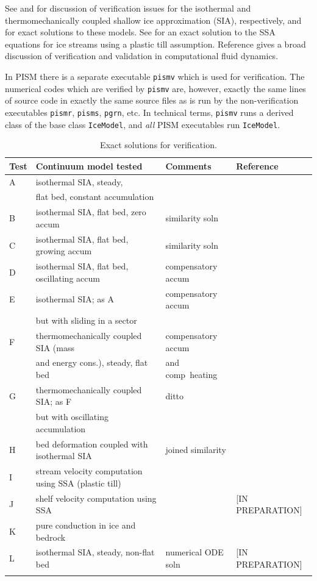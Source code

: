\documentclass[11pt,final]{amsart}
\begin{document}
See \cite{BLKCB} and \cite{BBL} for discussion of verification issues for the isothermal and thermomechanically coupled shallow ice approximation (SIA), respectively, and for exact solutions to these models.  See \cite{SchoofStream} for an exact solution to the SSA equations for ice streams using a plastic till assumption.  Reference \cite{Roache} gives a broad discussion of verification and validation in computational fluid dynamics.

In PISM there is a separate executable \verb|pismv| which is used for verification.  The numerical codes which are verified by \verb|pismv| are, however, exactly the same lines of source code in exactly the same source files as is run by the non-verification executables \verb|pismr|, \verb|pisms|, \verb|pgrn|, etc.  In technical terms, \verb|pismv| runs a derived class of the base class \verb|IceModel|, and \emph{all} PISM executables run \verb|IceModel|.

\begin{table}[ht]
\caption{Exact solutions for verification.}\label{tab:tests}
\small
\begin{tabular}{@{}llll}\hline
\textbf{Test} & \textbf{Continuum model tested} & \textbf{Comments} & \textbf{Reference} \\ \hline
A & isothermal SIA, steady, &  & \cite{BLKCB} \\
 & flat bed, constant accumulation &  &  \\
B & isothermal SIA, flat bed, zero accum & similarity soln & \cite{BLKCB} \\
C & isothermal SIA, flat bed, growing accum & similarity soln & \cite{BLKCB} \\
D & isothermal SIA, flat bed, oscillating accum & compensatory accum & \cite{BLKCB} \\
E & isothermal SIA; as A &  compensatory accum & \cite{BLKCB} \\
 & but with sliding in a sector &  &  \\
F & thermomechanically coupled SIA (mass &  compensatory accum & \cite{BB,BBL} \\
 & and energy cons.), steady, flat bed & and comp~heating &  \\
G & thermomechanically coupled SIA; as F  & ditto & \cite{BB,BBL} \\
 & but with oscillating accumulation &  &  \\
H & bed deformation coupled with isothermal SIA & joined similarity & \cite{BLKfastearth} \\
I & stream velocity computation using SSA (plastic till) &  & \cite{SchoofStream} \\
J & shelf velocity computation using SSA  &  & [IN PREPARATION] \\
K & pure conduction in ice and bedrock & & \cite{BuelerTestK} \\
L & isothermal SIA, steady, non-flat bed & numerical ODE soln & [IN PREPARATION] \\
\hline
\normalsize
\end{tabular}
\end{table}
\end{document}
